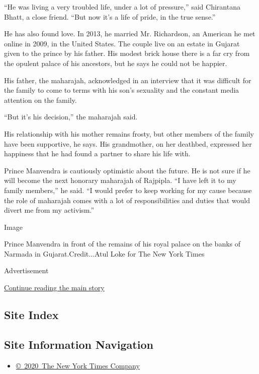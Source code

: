 ``He was living a very troubled life, under a lot of pressure,'' said
Chirantana Bhatt, a close friend. ``But now it's a life of pride, in the
true sense.''

He has also found love. In 2013, he married Mr. Richardson, an American
he met online in 2009, in the United States. The couple live on an
estate in Gujarat given to the prince by his father. His modest brick
house there is a far cry from the opulent palace of his ancestors, but
he says he could not be happier.

His father, the maharajah, acknowledged in an interview that it was
difficult for the family to come to terms with his son's sexuality and
the constant media attention on the family.

``But it's his decision,'' the maharajah said.

His relationship with his mother remains frosty, but other members of
the family have been supportive, he says. His grandmother, on her
deathbed, expressed her happiness that he had found a partner to share
his life with.

Prince Manvendra is cautiously optimistic about the future. He is not
sure if he will become the next honorary maharajah of Rajpipla. ``I have
left it to my family members,'' he said. ``I would prefer to keep
working for my cause because the role of maharajah comes with a lot of
responsibilities and duties that would divert me from my activism.''

Image

Prince Manvendra in front of the remains of his royal palace on the
banks of Narmada in Gujarat.Credit...Atul Loke for The New York Times

Advertisement

\protect\hyperlink{after-bottom}{Continue reading the main story}

\hypertarget{site-index}{%
\subsection{Site Index}\label{site-index}}

\hypertarget{site-information-navigation}{%
\subsection{Site Information
Navigation}\label{site-information-navigation}}

\begin{itemize}
\tightlist
\item
  \href{https://help.nytimes.com/hc/en-us/articles/115014792127-Copyright-notice}{©~2020~The
  New York Times Company}
\end{itemize}

